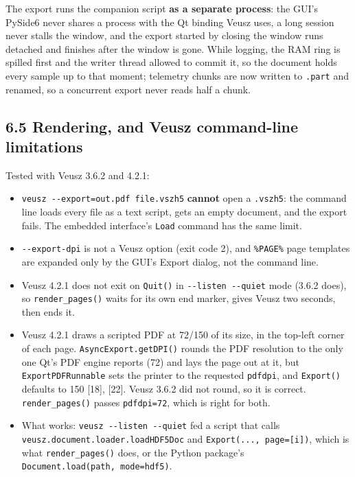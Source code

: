 \documentclass[
\directlua{luaotfload.add_fallback("qsfallback", {"DejaVu Sans:mode=harf;", "DejaVu Sans Mono:mode=harf;", "DejaVu Math TeX Gyre:mode=harf;"})}
  10pt,
  letterpaper,
]{article}
\providecommand{\tightlist}{%
  \setlength{\itemsep}{0pt}\setlength{\parskip}{0pt}}
\begin{document}
The export runs the companion script \textbf{as a separate process}: the
GUI's PySide6 never shares a process with the Qt binding Veusz uses, a
long session never stalls the window, and the export started by closing
the window runs detached and finishes after the window is gone. While
logging, the RAM ring is spilled first and the writer thread allowed to
commit it, so the document holds every sample up to that moment;
telemetry chunks are now written to \texttt{.part} and renamed, so a
concurrent export never reads half a chunk.

\hypertarget{rendering-and-veusz-command-line-limitations}{%
\subsection{6.5 Rendering, and Veusz command-line
limitations}\label{rendering-and-veusz-command-line-limitations}}

Tested with Veusz 3.6.2 and 4.2.1:

\begin{itemize}
\tightlist
\item
  \texttt{veusz\ -\/-export=out.pdf\ file.vszh5} \textbf{cannot} open a
  \texttt{.vszh5}: the command line loads every file as a text script,
  gets an empty document, and the export fails. The embedded interface's
  \texttt{Load} command has the same limit.
\item
  \texttt{-\/-export-dpi} is not a Veusz option (exit code 2), and
  \texttt{\%PAGE\%} page templates are expanded only by the GUI's Export
  dialog, not the command line.
\item
  Veusz 4.2.1 does not exit on \texttt{Quit()} in
  \texttt{-\/-listen\ -\/-quiet} mode (3.6.2 does), so
  \texttt{render\_pages()} waits for its own end marker, gives Veusz two
  seconds, then ends it.
\item
  Veusz 4.2.1 draws a scripted PDF at 72/150 of its size, in the
  top-left corner of each page. \texttt{AsyncExport.getDPI()} rounds the
  PDF resolution to the only one Qt's PDF engine reports (72) and lays
  the page out at it, but \texttt{ExportPDFRunnable} sets the printer to
  the requested \texttt{pdfdpi}, and \texttt{Export()} defaults to 150
  {[}18{]}, {[}22{]}. Veusz 3.6.2 did not round, so it is correct.
  \texttt{render\_pages()} passes \texttt{pdfdpi=72}, which is right for
  both.
\item
  What works: \texttt{veusz\ -\/-listen\ -\/-quiet} fed a script that
  calls \texttt{veusz.document.loader.loadHDF5Doc} and
  \texttt{Export(...,\ page={[}i{]})}, which is what
  \texttt{render\_pages()} does, or the Python package's
  \texttt{Document.load(path,\ mode=\textquotesingle{}hdf5\textquotesingle{})}.
\end{itemize}
\end{document}
